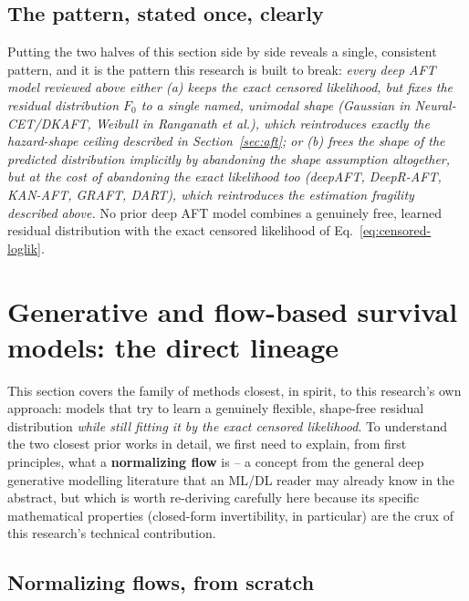\documentclass[11pt]{article}
\begin{document}
\subsection{The pattern, stated once, clearly}
Putting the two halves of this section side by side reveals a single,
consistent pattern, and it is the pattern this research is built to
break: \emph{every deep AFT model reviewed above either (a) keeps the
exact censored likelihood, but fixes the residual distribution $F_0$ to a
single named, unimodal shape (Gaussian in Neural-CET/DKAFT, Weibull in
Ranganath et al.), which reintroduces exactly the hazard-shape ceiling
described in Section~\ref{sec:aft}; or (b) frees the shape of the
predicted distribution implicitly by abandoning the shape assumption
altogether, but at the cost of abandoning the exact likelihood too
(deepAFT, DeepR-AFT, KAN-AFT, GRAFT, DART), which reintroduces the
estimation fragility described above.} No prior deep AFT model combines
a genuinely free, learned residual distribution with the exact censored
likelihood of Eq.~\eqref{eq:censored-loglik}.

\section{Generative and flow-based survival models: the direct lineage}
\label{sec:generative}

This section covers the family of methods closest, in spirit, to this
research's own approach: models that try to learn a genuinely flexible,
shape-free residual distribution \emph{while still fitting it by the
exact censored likelihood}. To understand the two closest prior works in
detail, we first need to explain, from first principles, what a
\textbf{normalizing flow} is -- a concept from the general deep
generative modelling literature that an ML/DL reader may already know in
the abstract, but which is worth re-deriving carefully here because its
specific mathematical properties (closed-form invertibility, in
particular) are the crux of this research's technical contribution.

\subsection{Normalizing flows, from scratch}
\label{sec:flows-from-scratch}
\end{document}

